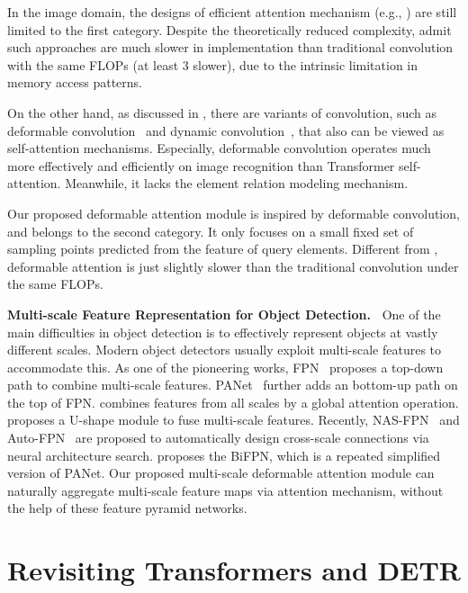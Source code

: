 \documentclass{article}
\begin{document}
In the image domain, the designs of efficient attention mechanism (e.g., \citet{parmar2018image,child2019generating,huang2019ccnet,ho2019axial,wang2020axial,hu2019local,ramachandran2019stand}) are still limited to the first category. Despite the theoretically reduced complexity, \citet{ramachandran2019stand,hu2019local} admit such approaches are much slower in implementation than traditional convolution with the same FLOPs (at least 3 slower), due to the intrinsic limitation in memory access patterns.

On the other hand, as discussed in \citet{zhu2019empirical}, there are variants of
convolution, such as deformable convolution~\citep{dai2017deformable,zhu2019deformable} and dynamic convolution~\citep{wu2019pay}, that also can be viewed as self-attention mechanisms. Especially, deformable convolution operates much more effectively
and efficiently on image recognition than Transformer self-attention. Meanwhile, it lacks the element relation modeling mechanism.

Our proposed deformable attention module is inspired by deformable convolution, and belongs to the second category. It only focuses on a small fixed set of sampling points predicted from the feature of query elements.
Different from \citet{ramachandran2019stand,hu2019local}, deformable attention is just slightly slower than the traditional convolution under the same FLOPs.

\textbf{Multi-scale Feature Representation for Object Detection.~}
One of the main difficulties in object detection is to effectively represent objects at vastly different scales. Modern object detectors usually exploit multi-scale features to accommodate this.
As one of the pioneering works, FPN~\citep{lin2017feature} proposes a top-down path to combine multi-scale features. PANet~\citep{liu2018path} further adds an bottom-up path on the top of FPN. \citet{kong2018deep} combines features from all scales by a global attention operation. \citet{zhao2019m2det} proposes a U-shape module to fuse multi-scale features. Recently, NAS-FPN~\citep{ghiasi2019fpn} and Auto-FPN~\citep{xu2019auto} are proposed to automatically design cross-scale connections via neural architecture search. \citet{tan2020efficientdet} proposes the BiFPN, which is a repeated simplified version of PANet.
Our proposed multi-scale deformable attention module can naturally aggregate multi-scale feature maps via attention mechanism, without the help of these feature pyramid networks.

 \section{Revisiting Transformers and DETR}
\label{sec:revisit}
\end{document}
